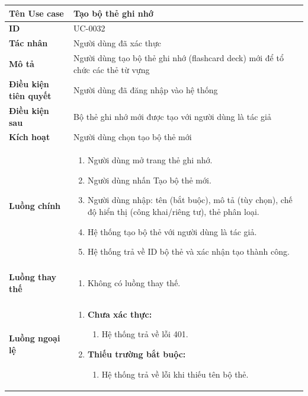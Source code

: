 {
\renewcommand{\arraystretch}{1.5}

\begin{tabularx}{\textwidth}{|>{\raggedright\arraybackslash}X|>{\raggedright\arraybackslash}X|}
\hline
\textbf{Tên Use case} & Tạo bộ thẻ ghi nhớ \\
\hline
\textbf{ID} & UC-0032 \\
\hline
\textbf{Tác nhân} & Người dùng đã xác thực \\
\hline
\textbf{Mô tả} & Người dùng tạo bộ thẻ ghi nhớ (flashcard deck) mới để tổ chức các thẻ từ vựng \\
\hline
\textbf{Điều kiện tiên quyết} & Người dùng đã đăng nhập vào hệ thống \\
\hline
\textbf{Điều kiện sau} & Bộ thẻ ghi nhớ mới được tạo với người dùng là tác giả \\
\hline
\textbf{Kích hoạt} & Người dùng chọn tạo bộ thẻ mới \\
\hline
\textbf{Luồng chính} &
\begin{enumerate}
    \item Người dùng mở trang thẻ ghi nhớ.
    \item Người dùng nhấn Tạo bộ thẻ mới.
    \item Người dùng nhập: tên (bắt buộc), mô tả (tùy chọn), chế độ hiển thị (công khai/riêng tư), thẻ phân loại.
    \item Hệ thống tạo bộ thẻ với người dùng là tác giả.
    \item Hệ thống trả về ID bộ thẻ và xác nhận tạo thành công.
\end{enumerate} \\
\hline
\textbf{Luồng thay thế} &
\begin{enumerate}
    \item Không có luồng thay thế.
\end{enumerate} \\
\hline
\textbf{Luồng ngoại lệ} &
\begin{enumerate}
    \item \textbf{Chưa xác thực:}
    \begin{enumerate}
        \item[2Err.] Hệ thống trả về lỗi 401.
    \end{enumerate}
    \item \textbf{Thiếu trường bắt buộc:}
    \begin{enumerate}
        \item[4Err.] Hệ thống trả về lỗi khi thiếu tên bộ thẻ.
    \end{enumerate}
\end{enumerate} \\
\hline
\end{tabularx}
}
